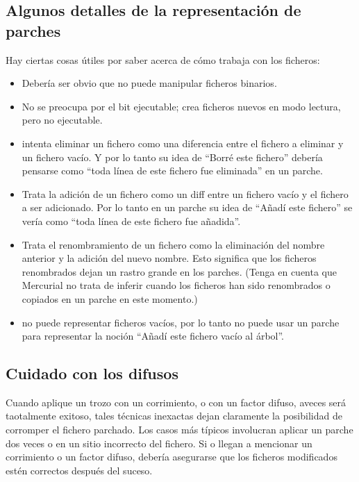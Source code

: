 \subsection{Algunos detalles de la representación de parches}

Hay ciertas cosas útiles por saber acerca de cómo trabaja
 con los ficheros:
\begin{itemize}
\item Debería ser obvio que  no puede manipular
  ficheros binarios.
\item No se preocupa por el bit ejecutable; crea ficheros nuevos en
  modo lectura, pero no ejecutable.
\item {} intenta eliminar un fichero como una diferencia
  entre el fichero a eliminar y un fichero vacío.  Y por lo tanto su
  idea de ``Borré este fichero'' debería pensarse como ``toda línea de
  este fichero fue eliminada'' en un parche.
\item Trata la adición de un fichero como un diff entre un fichero
  vacío y el fichero a ser adicionado.  Por lo tanto en un parche su
  idea de ``Añadí este fichero'' se vería como ``toda línea de este
  fichero fue añadida''.
\item Trata el renombramiento de un fichero como la eliminación del
  nombre anterior y la adición del nuevo nombre.  Esto significa que
  los ficheros renombrados dejan un rastro grande en los parches.
  (Tenga en cuenta que Mercurial no trata de inferir cuando los
  ficheros han sido renombrados o copiados en un parche en este
  momento.)
\item {} no puede representar ficheros vacíos, por lo
  tanto no puede usar un parche para representar la noción ``Añadí
  este fichero vacío al árbol''.
\end{itemize}
\subsection{Cuidado con los difusos}

Cuando aplique un trozo con un corrimiento, o con un factor difuso,
aveces será taotalmente exitoso, tales técnicas inexactas dejan
claramente la posibilidad de corromper el fichero parchado.  Los casos
más típicos involucran aplicar un parche dos veces o en un sitio
incorrecto del fichero. Si  o  llegan
a mencionar un corrimiento o un factor difuso, debería asegurarse que
los ficheros modificados estén correctos después del suceso.

